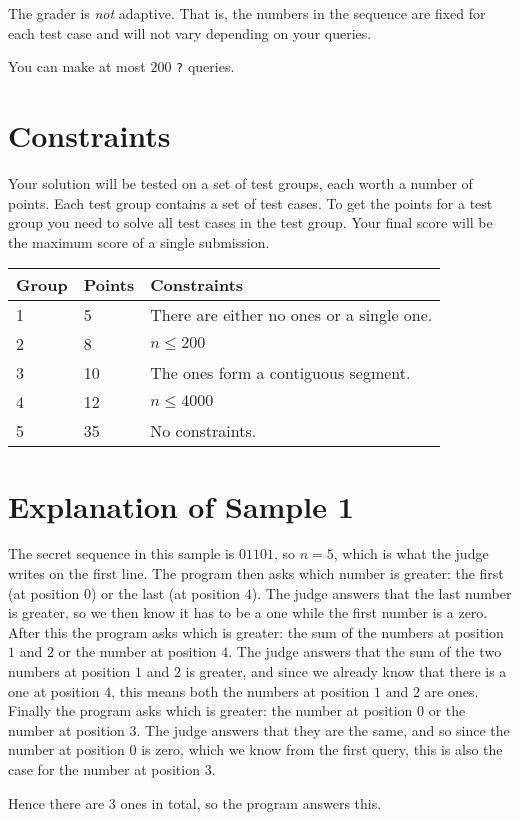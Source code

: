 The grader is \emph{not} adaptive.
That is, the numbers in the sequence are fixed for each test case and will not vary depending on your queries.

You can make at most $200$ \texttt{?} queries.

\section*{Constraints}
Your solution will be tested on a set of test groups, each worth a number of points.
Each test group contains a set of test cases.
To get the points for a test group you need to solve all test cases in the test group.
Your final score will be the maximum score of a single submission.

\noindent
\begin{tabular}{| l | l | l |}
\hline
Group & Points & Constraints \\ \hline
1     & 5     & There are either no ones or a single one. \\ \hline
2     & 8    & $n \leq 200$ \\ \hline
3     & 10    & The ones form a contiguous segment. \\ \hline
4     & 12    & $n \leq 4000$ \\ \hline
5     & 35    & No constraints. \\ \hline
\end{tabular}

\section*{Explanation of Sample 1}
The secret sequence in this sample is $01101$, so $n = 5$, which is what the judge writes on the first line.
The program then asks which number is greater: the first (at position $0$) or the last (at position $4$).
The judge answers that the last number is greater, so we then know it has to be a one while the first number is a zero.
After this the program asks which is greater: the sum of the numbers at position $1$ and $2$ or the number at position $4$.
The judge answers that the sum of the two numbers at position $1$ and $2$ is greater, and since we already
know that there is a one at position $4$, this means both the numbers at position $1$ and $2$ are ones.
Finally the program asks which is greater: the number at position $0$ or the number at position $3$.
The judge answers that they are the same, and so since the number at position $0$ is zero, which we know
from the first query, this is also the case for the number at position $3$.

Hence there are $3$ ones in total, so the program answers this.
